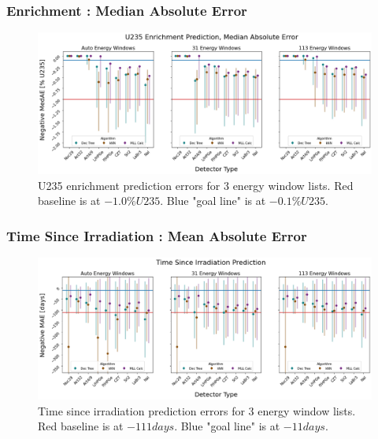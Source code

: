 \begin{frame}
  \frametitle{Enrichment : Median Absolute Error}
  \begin{adjustwidth}{-25pt}{0pt}
  \begin{figure}
    \centering
    \includegraphics[width=1.15\textwidth]{./figures/detector_preds_wrt_enlist_med_enrichment_median_err.png}
    \captionsetup{margin=0.6cm}
    \caption{U235 enrichment prediction errors for 3 energy window lists. 
             Red baseline is at $-1.0 \%U235$. Blue "goal line" is at $-0.1 \%U235$.}
  \end{figure}
  \end{adjustwidth}
\end{frame}

\begin{frame}
  \frametitle{Time Since Irradiation : Mean Absolute Error}
  \begin{adjustwidth}{-25pt}{0pt}
  \begin{figure}
    \centering
    \includegraphics[width=1.15\textwidth]{./figures/detector_preds_wrt_enlist_cooling.png}
    \captionsetup{margin=0.6cm}
    \caption{Time since irradiation prediction errors for 3 energy window lists. 
             Red baseline is at $-111 days$. Blue "goal line" is at $-11 days$.}
  \end{figure}
  \end{adjustwidth}
\end{frame}


